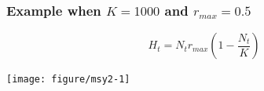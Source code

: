 \documentclass[color=usenames,dvipsnames]{beamer}\usepackage[]{graphicx}\usepackage[]{xcolor}
\begin{document}
\begin{frame}[fragile]
  \frametitle{Example when $K=1000$ and $r_{max}=0.5$}
  \scriptsize
  \[
    H_t = N_t r_{max}\left(1 - \frac{N_t}{K} \right)
  \]
  \vspace{-1cm}

\begin{center}
  \texttt{[image: figure/msy2-1]}
\end{center}
\end{frame}






\end{document}
